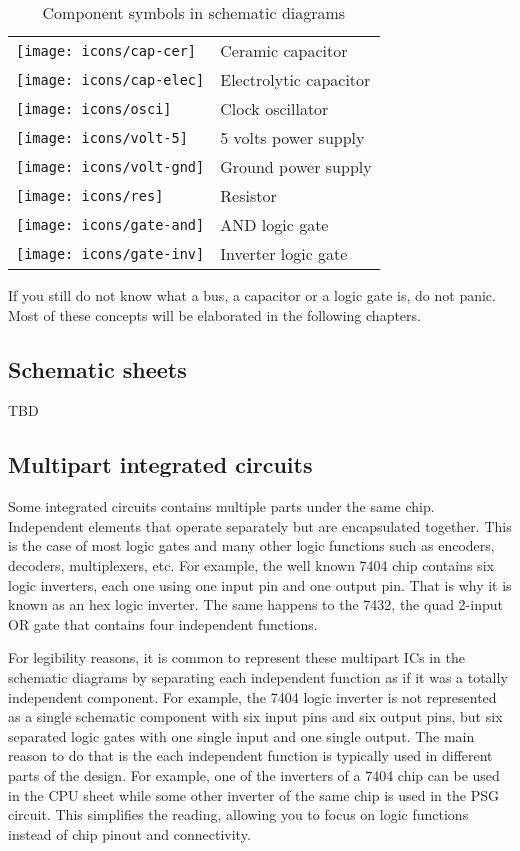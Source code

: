 \begin{table}[h!]
	\centering
	\begin{tabular}{ m{25mm}|l }
		\centering\texttt{[image: icons/cap-cer]}  & Ceramic capacitor      \\
		\centering\texttt{[image: icons/cap-elec]} & Electrolytic capacitor \\
		\centering\texttt{[image: icons/osci]}     & Clock oscillator       \\
		\centering\texttt{[image: icons/volt-5]}   & 5 volts power supply   \\
		\centering\texttt{[image: icons/volt-gnd]} & Ground power supply    \\
		\centering\texttt{[image: icons/res]}      & Resistor               \\
		\centering\texttt{[image: icons/gate-and]} & AND logic gate         \\
		\centering\texttt{[image: icons/gate-inv]} & Inverter logic gate    \\
	\end{tabular}
	\caption{Component symbols in schematic diagrams}
	\label{table:schematic-symbols}
\end{table}

If you still do not know what a bus, a capacitor or a logic gate is, do not panic. Most of these concepts will be elaborated in the following chapters.

\subsection{Schematic sheets}

TBD

\subsection{Multipart integrated circuits}

Some integrated circuits contains multiple parts under the same chip. Independent elements that operate separately but are encapsulated together. This is the case of most logic gates and many other logic functions such as encoders, decoders, multiplexers, etc. For example, the well known 7404 chip contains six logic inverters, each one using one input pin and one output pin. That is why it is known as an hex logic inverter. The same happens to the 7432, the quad 2-input OR gate that contains four independent functions. 

For legibility reasons, it is common to represent these multipart ICs in the schematic diagrams by separating each independent function as if it was a totally independent component. For example, the 7404 logic inverter is not represented as a single schematic component with six input pins and six output pins, but six separated logic gates with one single input and one single output. The main reason to do that is the each independent function is typically used in different parts of the design. For example, one of the inverters of a 7404 chip can be used in the CPU sheet while some other inverter of the same chip is used in the PSG circuit. This simplifies the reading, allowing you to focus on logic functions instead of chip pinout and connectivity. 

